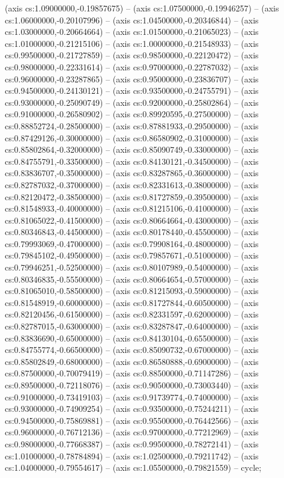 (axis cs:1.09000000,-0.19857675) -- (axis cs:1.07500000,-0.19946257) -- (axis cs:1.06000000,-0.20107996) -- (axis cs:1.04500000,-0.20346844) -- (axis cs:1.03000000,-0.20664664) -- (axis cs:1.01500000,-0.21065023) -- (axis cs:1.01000000,-0.21215106) -- (axis cs:1.00000000,-0.21548933) -- (axis cs:0.99500000,-0.21727859) -- (axis cs:0.98500000,-0.22120472) -- (axis cs:0.98000000,-0.22331614) -- (axis cs:0.97000000,-0.22787032) -- (axis cs:0.96000000,-0.23287865) -- (axis cs:0.95000000,-0.23836707) -- (axis cs:0.94500000,-0.24130121) -- (axis cs:0.93500000,-0.24755791) -- (axis cs:0.93000000,-0.25090749) -- (axis cs:0.92000000,-0.25802864) -- (axis cs:0.91000000,-0.26580902) -- (axis cs:0.89920595,-0.27500000) -- (axis cs:0.88852724,-0.28500000) -- (axis cs:0.87881933,-0.29500000) -- (axis cs:0.87429126,-0.30000000) -- (axis cs:0.86580902,-0.31000000) -- (axis cs:0.85802864,-0.32000000) -- (axis cs:0.85090749,-0.33000000) -- (axis cs:0.84755791,-0.33500000) -- (axis cs:0.84130121,-0.34500000) -- (axis cs:0.83836707,-0.35000000) -- (axis cs:0.83287865,-0.36000000) -- (axis cs:0.82787032,-0.37000000) -- (axis cs:0.82331613,-0.38000000) -- (axis cs:0.82120472,-0.38500000) -- (axis cs:0.81727859,-0.39500000) -- (axis cs:0.81548933,-0.40000000) -- (axis cs:0.81215106,-0.41000000) -- (axis cs:0.81065022,-0.41500000) -- (axis cs:0.80664664,-0.43000000) -- (axis cs:0.80346843,-0.44500000) -- (axis cs:0.80178440,-0.45500000) -- (axis cs:0.79993069,-0.47000000) -- (axis cs:0.79908164,-0.48000000) -- (axis cs:0.79845102,-0.49500000) -- (axis cs:0.79857671,-0.51000000) -- (axis cs:0.79946251,-0.52500000) -- (axis cs:0.80107989,-0.54000000) -- (axis cs:0.80346835,-0.55500000) -- (axis cs:0.80664654,-0.57000000) -- (axis cs:0.81065010,-0.58500000) -- (axis cs:0.81215093,-0.59000000) -- (axis cs:0.81548919,-0.60000000) -- (axis cs:0.81727844,-0.60500000) -- (axis cs:0.82120456,-0.61500000) -- (axis cs:0.82331597,-0.62000000) -- (axis cs:0.82787015,-0.63000000) -- (axis cs:0.83287847,-0.64000000) -- (axis cs:0.83836690,-0.65000000) -- (axis cs:0.84130104,-0.65500000) -- (axis cs:0.84755774,-0.66500000) -- (axis cs:0.85090732,-0.67000000) -- (axis cs:0.85802849,-0.68000000) -- (axis cs:0.86580888,-0.69000000) -- (axis cs:0.87500000,-0.70079419) -- (axis cs:0.88500000,-0.71147286) -- (axis cs:0.89500000,-0.72118076) -- (axis cs:0.90500000,-0.73003440) -- (axis cs:0.91000000,-0.73419103) -- (axis cs:0.91739774,-0.74000000) -- (axis cs:0.93000000,-0.74909254) -- (axis cs:0.93500000,-0.75244211) -- (axis cs:0.94500000,-0.75869881) -- (axis cs:0.95500000,-0.76442566) -- (axis cs:0.96000000,-0.76712136) -- (axis cs:0.97000000,-0.77212969) -- (axis cs:0.98000000,-0.77668387) -- (axis cs:0.99500000,-0.78272141) -- (axis cs:1.01000000,-0.78784894) -- (axis cs:1.02500000,-0.79211742) -- (axis cs:1.04000000,-0.79554617) -- (axis cs:1.05500000,-0.79821559) -- cycle;
